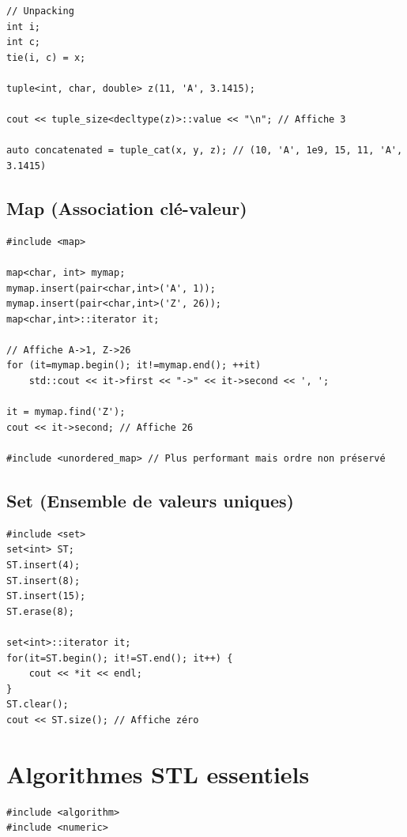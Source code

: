 \documentclass{article}
\begin{document}
\begin{multicols*}{3}
\begin{lstlisting}
// Unpacking
int i;
int c;
tie(i, c) = x;

tuple<int, char, double> z(11, 'A', 3.1415);

cout << tuple_size<decltype(z)>::value << "\n"; // Affiche 3

auto concatenated = tuple_cat(x, y, z); // (10, 'A', 1e9, 15, 11, 'A', 3.1415)

\end{lstlisting}

    \subsection*{Map (Association clé-valeur)}

    \begin{lstlisting}
#include <map>

map<char, int> mymap;
mymap.insert(pair<char,int>('A', 1));
mymap.insert(pair<char,int>('Z', 26));
map<char,int>::iterator it;

// Affiche A->1, Z->26
for (it=mymap.begin(); it!=mymap.end(); ++it)
    std::cout << it->first << "->" << it->second << ', ';

it = mymap.find('Z');
cout << it->second; // Affiche 26

#include <unordered_map> // Plus performant mais ordre non préservé

\end{lstlisting}

    \subsection*{Set (Ensemble de valeurs uniques)}

    \begin{lstlisting}
#include <set>
set<int> ST;
ST.insert(4);
ST.insert(8);
ST.insert(15);
ST.erase(8);

set<int>::iterator it;
for(it=ST.begin(); it!=ST.end(); it++) {
    cout << *it << endl;
}
ST.clear();
cout << ST.size(); // Affiche zéro

\end{lstlisting}

    \section*{Algorithmes STL essentiels}

    \begin{lstlisting}
#include <algorithm>
#include <numeric>


\end{lstlisting}
\end{multicols*}
\end{document}
